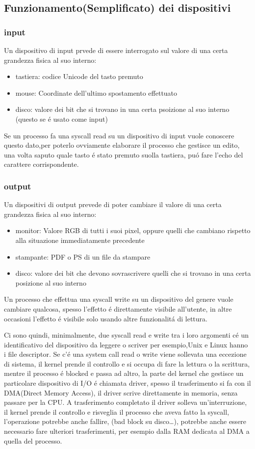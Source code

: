 \subsection{Funzionamento(Semplificato) dei dispositivi}
\subsubsection*{input}
Un dispositivo di input prvede di essere interrogato sul valore di una certa grandezza fisica al suo interno:
\begin{itemize}
    \item tastiera: codice Unicode del tasto premuto
    \item mouse: Coordinate dell'ultimo spostamento effettuato
    \item disco: valore dei bit che si trovano in una certa psoizione al suo interno (questo se é usato come input)
\end{itemize}
Se un processo fa una syscall read su un dispositivo di input vuole conoscere questo dato,per poterlo ovviamente elaborare il processo che
gestisce un edito, una volta saputo quale tasto é stato premuto suolla tastiera, puó fare l'echo del carattere corrispondente.
\subsubsection*{output}
Un dispositivi di output prevede di poter cambiare il valore di una certa grandezza fisica al suo interno:
\begin{itemize}
    \item monitor: Valore RGB di tutti i suoi pixel, oppure quelli che cambiano rispetto alla situazione immediatamente precedente
    \item stampante: PDF o PS di un file da stampare
    \item disco: valore dei bit che devono sovrascrivere quelli che si trovano in una certa posizione al suo interno
\end{itemize}
Un processo che effettua una syscall write su un dispositivo del genere vuole cambiare qualcosa, spesso l'effetto é direttamente visibile all'utente, in altre occasioni
l'effetto é visibile solo usando altre funzionalitá di lettura.

Ci sono quindi, minimalmente, due syscall read e write tra i loro argomenti cé un identificativo del dispositivo da leggere o scriver
per esempio,Unix e Linux hanno i file descriptor.
Se c'é una system call read o write viene sollevata una eccezione di sistema, il kernel prende il controllo e si occupa di fare la lettura o la scrittura,
mentre il processo é blocked e passa ad altro, la parte del kernel che gestisce un particolare dispositivo di I/O é chiamata driver, spesso il
trasferimento si fa con il DMA(Direct Memory Access), il driver scrive direttamente in memoria, senza passare per la CPU.
A trasferimento completato il driver solleva un'interruzione, il kernel prende il controllo e risveglia il processo che aveva fatto la syscall,
l'operazione potrebbe anche fallire, (bad block su disco\ldots), potrebbe anche essere necessario fare ulteriori trasferimenti, per esempio
dalla RAM dedicata al DMA a quella del processo.
